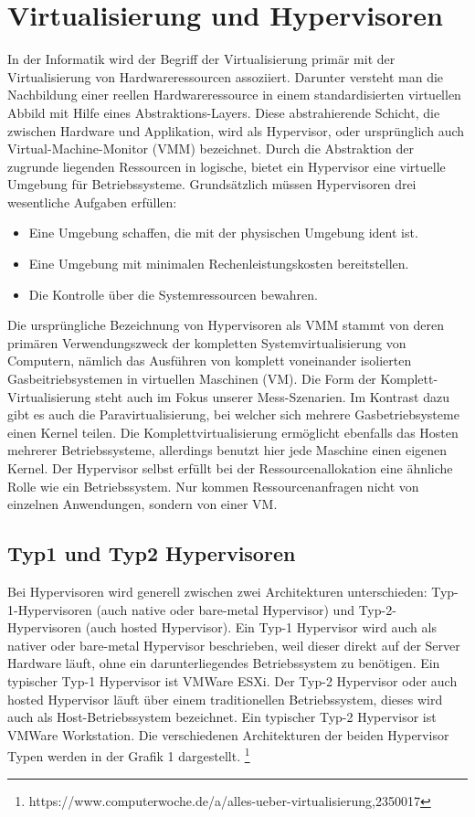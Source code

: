 \documentclass[conference]{IEEEtran}
\newcommand{\citep}{\cite}
\begin{document}
\section{Virtualisierung und Hypervisoren}
\label{Virtualisierung und Hypervisoren}	
In der Informatik wird der Begriff der Virtualisierung primär mit der Virtualisierung von Hardwareressourcen assoziiert. Darunter versteht man die Nachbildung einer reellen Hardwareressource in einem standardisierten virtuellen Abbild mit Hilfe eines Abstraktions-Layers. Diese abstrahierende Schicht, die zwischen Hardware und Applikation, wird als Hypervisor, oder ursprünglich auch Virtual-Machine-Monitor (VMM) bezeichnet. \cite{Portnoy2016} Durch die Abstraktion der zugrunde liegenden Ressourcen in logische, bietet ein Hypervisor eine virtuelle Umgebung für Betriebssysteme. Grundsätzlich müssen Hypervisoren drei wesentliche Aufgaben erfüllen: 
\begin{itemize}
	\item Eine Umgebung schaffen, die mit der physischen Umgebung ident ist. 
	\item Eine Umgebung mit minimalen Rechenleistungskosten bereitstellen. 
	\item Die Kontrolle über die Systemressourcen bewahren. 
\end{itemize}
\cite{Popek&Goldberg1974}

Die ursprüngliche Bezeichnung von Hypervisoren als VMM stammt von deren primären Verwendungszweck der kompletten Systemvirtualisierung von Computern, nämlich das Ausführen von komplett voneinander isolierten Gasbeitriebsystemen in virtuellen Maschinen (VM). Die Form der Komplett-Virtualisierung steht auch im Fokus unserer Mess-Szenarien. Im Kontrast dazu gibt es auch die Paravirtualisierung, bei welcher sich mehrere Gasbetriebsysteme einen Kernel teilen. Die Komplettvirtualisierung ermöglicht ebenfalls das Hosten mehrerer Betriebssysteme, allerdings benutzt hier jede Maschine einen eigenen Kernel. Der Hypervisor selbst erfüllt bei der Ressourcenallokation eine ähnliche Rolle wie ein Betriebssystem. Nur kommen Ressourcenanfragen nicht von einzelnen Anwendungen, sondern von einer VM. \citep{Goldberg1973}

\subsection{Typ1 und Typ2 Hypervisoren}
Bei Hypervisoren wird generell zwischen zwei Architekturen unterschieden: Typ-1-Hypervisoren (auch native oder bare-metal Hypervisor) und Typ-2-Hypervisoren (auch hosted Hypervisor). Ein Typ-1 Hypervisor wird auch als nativer oder bare-metal Hypervisor beschrieben, weil dieser direkt auf der Server Hardware läuft, ohne ein darunterliegendes Betriebssystem zu benötigen. Ein typischer Typ-1 Hypervisor ist VMWare ESXi. Der Typ-2 Hypervisor oder auch hosted Hypervisor läuft über einem traditionellen Betriebssystem, dieses wird auch als Host-Betriebssystem bezeichnet. Ein typischer Typ-2 Hypervisor ist VMWare Workstation. Die verschiedenen Architekturen der beiden Hypervisor Typen werden in der Grafik 1 dargestellt. \footnote{https://www.computerwoche.de/a/alles-ueber-virtualisierung,2350017} \citep{Goldberg1973}
\end{document}
